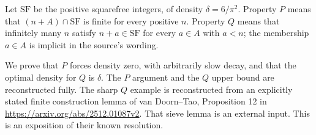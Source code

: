 Let $\mathrm{SF}$ be the positive squarefree integers, of density $\delta=6/\pi^2$. Property $P$ means that $(n+A)\cap\mathrm{SF}$ is finite for every positive $n$. Property $Q$ means that infinitely many $n$ satisfy $n+a\in\mathrm{SF}$ for every $a\in A$ with $a<n$; the membership $a\in A$ is implicit in the source's wording.

We prove that $P$ forces density zero, with arbitrarily slow decay, and that the optimal density for $Q$ is $\delta$. The $P$ argument and the $Q$ upper bound are reconstructed fully. The sharp $Q$ example is reconstructed from an explicitly stated finite construction lemma of van Doorn--Tao, Proposition 12 in \url{https://arxiv.org/abs/2512.01087v2}. That sieve lemma is an external input. This is an exposition of their known resolution.
